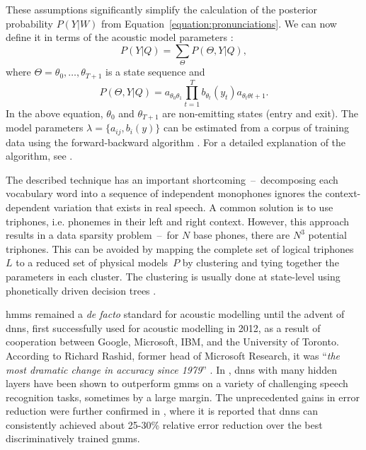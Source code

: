 These assumptions significantly simplify the calculation of the posterior probability $P(Y|W)$ from Equation~\ref{equation:pronunciations}. We can now define it in terms of the acoustic model parameters \cite{lu2013subspace}:
\begin{equation}
  P(Y|Q)=\sum_{\Theta}P(\Theta, Y|Q),
\end{equation}
where $\Theta=\theta_{0}, \ldots, \theta_{T+1}$ is a state sequence and
\begin{equation}
  \label{equation:states}
  P(\Theta, Y|Q)=a_{\theta_{0}\theta_{1}}\prod_{t=1}^{T}b_{\theta_{t}}(y_{t})a_{\theta_{t}\theta{t+1}}.
\end{equation}
In the above equation, $\theta_{0}$ and $\theta_{T+1}$ are non-emitting states (entry and exit). The model parameters $\lambda=\{a_{ij}, b_{i}(y)\}$ can be estimated from a corpus of training data using the forward-backward algorithm \cite{baum1970maximization}. For a detailed explanation of the algorithm, see \cite{rabiner1986introduction}.

The described technique has an important shortcoming~--~decomposing each vocabulary word into a sequence of independent monophones ignores the context-dependent variation that exists in real speech. A common solution is to use triphones, i.e. phonemes in their left and right context. However, this approach results in a data sparsity problem~--~for $N$ base phones, there are $N^{3}$ potential triphones. This can be avoided by mapping the complete set of logical triphones~$L$ to a reduced set of physical models~$P$ by clustering and tying together the parameters in each cluster. The clustering is usually done at state-level using phonetically driven decision trees \cite{gales2008application}.

\Glspl{hmm} remained a \textit{de facto} standard for acoustic modelling until the advent of \glspl{dnn}, first successfully used for acoustic modelling in 2012, as a result of cooperation between Google, Microsoft, IBM, and the University of Toronto. According to Richard Rashid, former head of Microsoft Research, it was \enquote{\textit{the most dramatic change in accuracy since 1979}} \cite{markoff2012scientists}. In \cite{hinton2012deep}, \glspl{dnn} with many hidden layers have been shown to outperform \glspl{gmm} on a variety of challenging speech recognition tasks, sometimes by a large margin. The unprecedented gains in error reduction were further confirmed in \cite{pan2012investigation}, where it is reported that \glspl{dnn} can consistently achieved about 25-30\% relative error reduction over the best discriminatively trained \glspl{gmm}.

